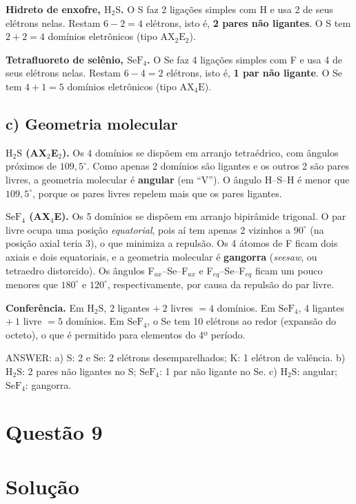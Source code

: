 \documentclass{article}%
\begin{document}
\textbf{Hidreto de enxofre, $\mathrm{H_2S}$.} O S faz 2 ligações simples com H e usa 2 de seus elétrons nelas. Restam $6-2=4$ elétrons, isto é, \textbf{2 pares não ligantes}. O S tem $2+2=4$ domínios eletrônicos (tipo $\mathrm{AX_2E_2}$).

\textbf{Tetrafluoreto de selênio, $\mathrm{SeF_4}$.} O Se faz 4 ligações simples com F e usa 4 de seus elétrons nelas. Restam $6-4=2$ elétrons, isto é, \textbf{1 par não ligante}. O Se tem $4+1=5$ domínios eletrônicos (tipo $\mathrm{AX_4E}$).

\subsection*{c) Geometria molecular}

\textbf{$\mathrm{H_2S}$ (AX$_2$E$_2$).} Os 4 domínios se dispõem em arranjo tetraédrico, com ângulos próximos de $109{,}5^\circ$. Como apenas 2 domínios são ligantes e os outros 2 são pares livres, a geometria molecular é \textbf{angular} (em ``V''). O ângulo H--S--H é menor que $109{,}5^\circ$, porque os pares livres repelem mais que os pares ligantes.

\textbf{$\mathrm{SeF_4}$ (AX$_4$E).} Os 5 domínios se dispõem em arranjo bipirâmide trigonal. O par livre ocupa uma posição \emph{equatorial}, pois aí tem apenas 2 vizinhos a $90^\circ$ (na posição axial teria 3), o que minimiza a repulsão. Os 4 átomos de F ficam dois axiais e dois equatoriais, e a geometria molecular é \textbf{gangorra} (\emph{seesaw}, ou tetraedro distorcido). Os ângulos F$_{ax}$--Se--F$_{ax}$ e F$_{eq}$--Se--F$_{eq}$ ficam um pouco menores que $180^\circ$ e $120^\circ$, respectivamente, por causa da repulsão do par livre.

\textbf{Conferência.} Em $\mathrm{H_2S}$, $2$ ligantes $+\ 2$ livres $=4$ domínios. Em $\mathrm{SeF_4}$, $4$ ligantes $+\ 1$ livre $=5$ domínios. Em $\mathrm{SeF_4}$, o Se tem 10 elétrons ao redor (expansão do octeto), o que é permitido para elementos do 4º período.

\medskip
\noindent ANSWER: a) S: 2 e Se: 2 elétrons desemparelhados; K: 1 elétron de valência. b) $\mathrm{H_2S}$: 2 pares não ligantes no S; $\mathrm{SeF_4}$: 1 par não ligante no Se. c) $\mathrm{H_2S}$: angular; $\mathrm{SeF_4}$: gangorra.%
\newpage%
\section*{Questão 9}

\section*{Solução}
\end{document}
